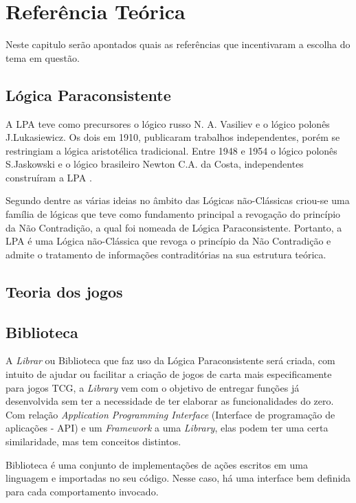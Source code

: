 
\chapter{Referência Teórica}

Neste capitulo serão apontados quais as referências que incentivaram a escolha do tema em questão.

\section{Lógica Paraconsistente}

A LPA teve como precursores o lógico russo N. A. Vasiliev e o lógico polonês J.Lukasiewicz. Os dois em 1910, publicaram trabalhos independentes, porém se restringiam a lógica aristotélica tradicional. Entre 1948 e 1954 o lógico polonês S.Jaskowski e o lógico brasileiro Newton C.A. da Costa, independentes construíram a LPA \cite[p. 27]{tomda-decisao-lpa-2011}.

Segundo  dentre as várias ideias no âmbito das Lógicas não-Clássicas criou-se uma família de lógicas que teve como fundamento principal a  revogação do princípio da Não Contradição, a qual foi nomeada de Lógica Paraconsistente. Portanto, a LPA é uma Lógica não-Clássica que
revoga o princípio da Não Contradição e admite o tratamento de informações
contraditórias na sua estrutura teórica.

\section{Teoria dos jogos}

\section{Biblioteca}

A \textit{Librar} ou Biblioteca que faz uso da Lógica Paraconsistente será criada, com intuito de ajudar ou facilitar a criação de jogos de carta mais especificamente para jogos TCG, a \textit{Library} vem com o objetivo de entregar funções já desenvolvida sem ter a necessidade de ter elaborar as funcionalidades do zero.
Com relação \textit{Application Programming Interface} (Interface de programação de aplicações - API) e um \textit{Framework} a uma \textit{Library}, elas podem ter uma
certa similaridade, mas tem conceitos distintos.

Biblioteca é uma conjunto de implementações de ações escritos em uma linguagem e importadas no seu código. Nesse caso, há uma interface bem definida para cada comportamento invocado.


